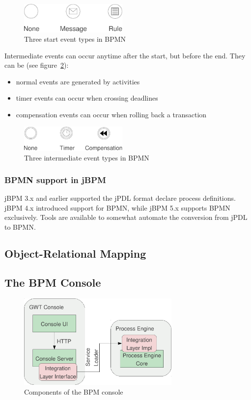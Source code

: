 \begin{figure}[H]
\centering
\includegraphics[width=200px,keepaspectratio]{bpmn-start-event-types.pdf}
\caption{Three start event types in BPMN}
\label{fig:bpmn-start-event-types}
\end{figure}

Intermediate events can occur anytime after the start, but before the end. They
can be (see figure~\ref{fig:bpmn-intermediate-event-types}):

\begin{itemize}
\item normal events are generated by activities
\item timer events can occur when crossing deadlines
\item compensation events can occur when rolling back a transaction
\end{itemize}

\begin{figure}[H]
\centering
\includegraphics[width=200px,keepaspectratio]{bpmn-intermediate-event-types.pdf}
\caption{Three intermediate event types in BPMN}
\label{fig:bpmn-intermediate-event-types}
\end{figure}

\subsubsection*{BPMN support in jBPM}

jBPM 3.x and earlier supported the jPDL format declare process definitions.
jBPM 4.x introduced support for BPMN, while jBPM 5.x supports BPMN exclusively.
Tools are available to somewhat automate the conversion from jPDL to BPMN.

\subsection{Object-Relational Mapping}

\subsection{The BPM Console}

\begin{figure}[H]
\centering
\includegraphics[width=300px,keepaspectratio]{bpm-console.pdf}
\caption{Components of the BPM console}
\label{fig:bpm-console}
\end{figure}
